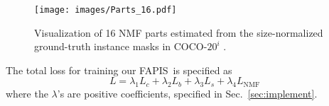 \documentclass[final]{cvpr}
\def\Approach{FAPIS}
\begin{document}
\begin{figure}[h!]
    \centering
    \texttt{[image: images/Parts\_16.pdf]}
    \caption{Visualization of 16 NMF parts estimated from the size-normalized ground-truth instance masks in COCO-$20^i$ \cite{michaelis2018one}.}
    \label{fig:NMF_parts}
\end{figure}


The total loss for training our \Approach~is specified as
%
\begin{equation}
\label{eq:total_loss}
    L = \lambda_1 L_{c} + \lambda_2 L_{b} + \lambda_3 L_{s} + \lambda_4 L_{\text{NMF}}
\end{equation} 
%
where the $\lambda$'s are positive coefficients, specified in Sec.~\ref{sec:implement}.









\end{document}
